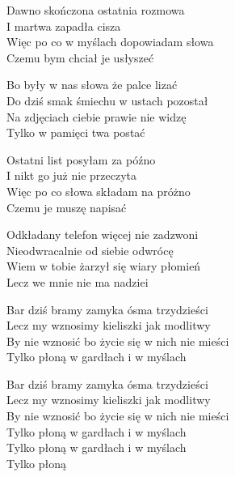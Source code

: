 \begin{text}
    Dawno skończona ostatnia rozmowa\\
    I martwa zapadła cisza\\
    Więc po co w myślach dopowiadam słowa\\
    Czemu bym chciał je usłyszeć

    Bo były w nas słowa że palce lizać\\
    Do dziś smak śmiechu w ustach pozostał\\
    Na zdjęciach ciebie prawie nie widzę\\
    Tylko w pamięci twa postać

    Ostatni list posyłam za późno\\
    I nikt go już nie przeczyta\\
    Więc po co słowa składam na próżno\\
    Czemu je muszę napisać

    Odkładany telefon więcej nie zadzwoni\\
    Nieodwracalnie od siebie odwrócę\\
    Wiem w tobie żarzył się wiary płomień\\
    Lecz we mnie nie ma nadziei

    Bar dziś bramy zamyka ósma trzydzieści\\
    Lecz my wznosimy kieliszki jak modlitwy\\
    By nie wznosić bo życie się w nich nie mieści\\
    Tylko płoną w gardłach i w myślach

    Bar dziś bramy zamyka ósma trzydzieści\\
    Lecz my wznosimy kieliszki jak modlitwy\\
    By nie wznosić bo życie się w nich nie mieści\\
    Tylko płoną w gardłach i w myślach\\
    Tylko płoną w gardłach i w myślach\\
    Tylko płoną
\end{text}
\begin{chord}

\end{chord}